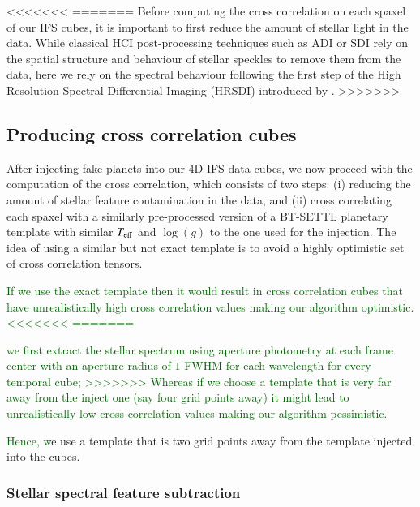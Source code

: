 \documentclass{aa}
\newcommand{\newchange}[1]{\textcolor{darkgreen}{#1}}
\begin{document}
{<<<<<<<
=======
Before computing the cross correlation on each spaxel of our IFS cubes, it is important to first reduce the amount of stellar light in the data. 
While classical HCI post-processing techniques such as ADI or SDI rely on the spatial structure and behaviour of stellar speckles to remove them from the data, here we rely on the spectral behaviour following the first step of the High Resolution Spectral Differential Imaging (HRSDI) introduced by \citet{2019Haffert}. 
>>>>>>>
\subsection{Producing cross correlation cubes}\label{sec:specpreproc}

After injecting fake planets into our 4D IFS data cubes, we now proceed with the computation of the cross correlation, which consists of two steps: (i) reducing the amount of stellar feature contamination in the data, and (ii) cross correlating each spaxel with a similarly pre-processed version of a BT-SETTL planetary template with similar $T_{\rm eff}$ and $\log(g)$ to the one used for the injection.
The idea of using a similar but not exact template is to avoid a highly optimistic set of cross correlation tensors.
\newchange{If we use the exact template then it would result in cross correlation cubes that have unrealistically high cross correlation values making our algorithm optimistic. 
<<<<<<<
=======
    \item we first extract the stellar spectrum using aperture photometry at each frame center with an aperture radius of $1$ FWHM for each wavelength for every temporal cube;
>>>>>>>
Whereas if we choose a template that is very far away from the inject one (say four grid points away) it might lead to unrealistically low cross correlation values making our algorithm pessimistic.}
\newchange{Hence, w}e use a template that is two grid points away from the template injected into the cubes.

\subsubsection{Stellar spectral feature subtraction}

}
\end{document}

